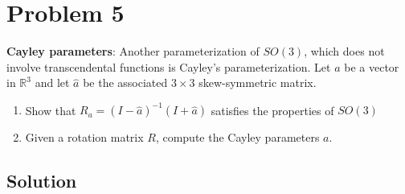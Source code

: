 \section*{Problem 5}

\textbf{Cayley parameters}:
Another parameterization of \(S O(3)\), which does not involve transcendental functions is Cayley's parameterization.
Let \(a\) be a vector in \(\mathbb{R}^{3}\) and let \(\hat{a}\) be the associated \(3 \times 3\) skew-symmetric matrix.
\begin{enumerate}[label= (\alph*)]
    \item Show that \(R_{a}=(I-\hat{a})^{-1}(I+\hat{a})\) satisfies the properties of \(S O(3)\)
    \item Given a rotation matrix \(R\), compute the Cayley parameters \(a\).
\end{enumerate}

\subsection*{Solution}
